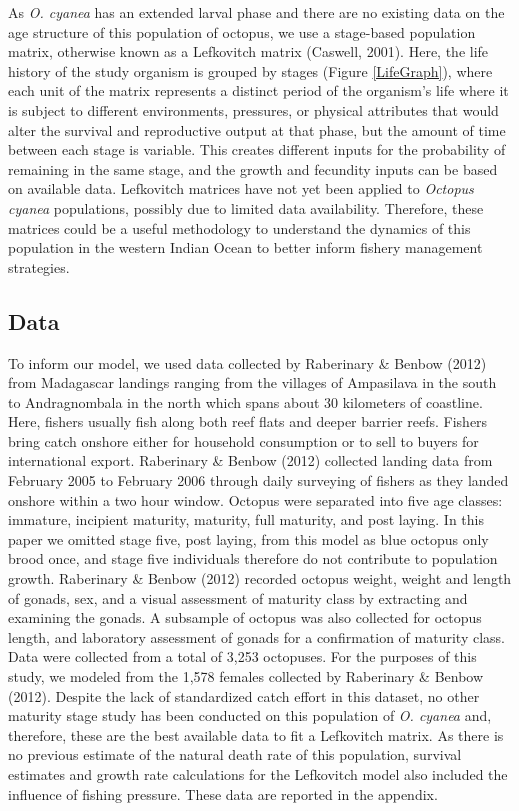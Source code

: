 \documentclass[
  12pt,
]{article}
\begin{document}
As \emph{O. cyanea} has an extended larval phase and there are no existing data on the age structure of this population of octopus, we use a stage-based population matrix, otherwise known as a Lefkovitch matrix (Caswell, 2001). Here, the life history of the study organism is grouped by stages (Figure \ref{LifeGraph}), where each unit of the matrix represents a distinct period of the organism's life where it is subject to different environments, pressures, or physical attributes that would alter the survival and reproductive output at that phase, but the amount of time between each stage is variable. This creates different inputs for the probability of remaining in the same stage, and the growth and fecundity inputs can be based on available data. Lefkovitch matrices have not yet been applied to \emph{Octopus cyanea} populations, possibly due to limited data availability. Therefore, these matrices could be a useful methodology to understand the dynamics of this population in the western Indian Ocean to better inform fishery management strategies.

\hypertarget{data}{%
\subsection{Data}\label{data}}

To inform our model, we used data collected by Raberinary \& Benbow (2012) from Madagascar landings ranging from the villages of Ampasilava in the south to Andragnombala in the north which spans about 30 kilometers of coastline. Here, fishers usually fish along both reef flats and deeper barrier reefs. Fishers bring catch onshore either for household consumption or to sell to buyers for international export. Raberinary \& Benbow (2012) collected landing data from February 2005 to February 2006 through daily surveying of fishers as they landed onshore within a two hour window. Octopus were separated into five age classes: immature, incipient maturity, maturity, full maturity, and post laying. In this paper we omitted stage five, post laying, from this model as blue octopus only brood once, and stage five individuals therefore do not contribute to population growth. Raberinary \& Benbow (2012) recorded octopus weight, weight and length of gonads, sex, and a visual assessment of maturity class by extracting and examining the gonads. A subsample of octopus was also collected for octopus length, and laboratory assessment of gonads for a confirmation of maturity class. Data were collected from a total of 3,253 octopuses. For the purposes of this study, we modeled from the 1,578 females collected by Raberinary \& Benbow (2012). Despite the lack of standardized catch effort in this dataset, no other maturity stage study has been conducted on this population of \emph{O. cyanea} and, therefore, these are the best available data to fit a Lefkovitch matrix. As there is no previous estimate of the natural death rate of this population, survival estimates and growth rate calculations for the Lefkovitch model also included the influence of fishing pressure. These data are reported in the appendix.
\end{document}
